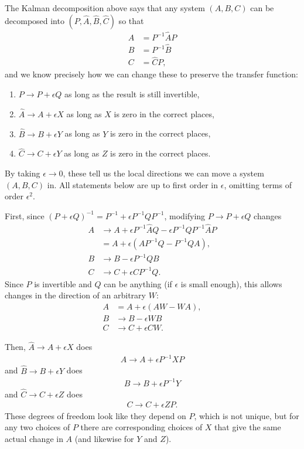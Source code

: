 \documentclass{article}
\newcommand{\1}{\mathbbm{1}}
\begin{document}
The Kalman decomposition above says that any system $(A,B,C)$ can be decomposed into
$(P, \hat A, \hat B, \hat C)$ so that
$$\begin{aligned}
    A &= P^{-1} \hat A P  \\
    B &= P^{-1} \hat B  \\
    C &= \hat C P ,
\end{aligned}$$
and we know precisely how we can change these to preserve the transfer function:
\begin{enumerate}
    \item $P \to P + \epsilon Q$ as long as the result is still invertible,
    \item $\hat A \to A + \epsilon X$ as long as $X$ is zero in the correct places,
    \item $\hat B \to B + \epsilon Y$ as long as $Y$ is zero in the correct places,
    \item $\hat C \to C + \epsilon Y$ as long as $Z$ is zero in the correct places.
\end{enumerate}
By taking $\epsilon \to 0$, these tell us the local directions we can move a system $(A,B,C)$ in.
All statements below are up to first order in $\epsilon$,
omitting terms of order $\epsilon^2$.

First, since $(P + \epsilon Q)^{-1} = P^{-1} + \epsilon P^{-1} Q P^{-1}$,
modifying $P \to P + \epsilon Q$ changes
$$\begin{aligned}
    A 
        &\to A + \epsilon P^{-1} \hat A Q - \epsilon P^{-1} Q P^{-1} \hat A P \\
        &= A + \epsilon \left(A P^{-1} Q - P^{-1} Q A\right) , \\
    B
        &\to B - \epsilon P^{-1} Q B \\
    C
        &\to C + \epsilon C P^{-1} Q .
\end{aligned}$$
Since $P$ is invertible and $Q$ can be anything (if $\epsilon$ is small enough),
this allows changes in the direction of an arbitrary $W$:
$$\begin{aligned}
    A 
        &= A + \epsilon \left(A W - W A\right) , \\
    B
        &\to B - \epsilon W B \\
    C
        &\to C + \epsilon C W .
\end{aligned}$$

Then, $\hat A \to A + \epsilon X$  does
$$\begin{aligned}
    A \to A + \epsilon P^{-1} X P 
\end{aligned}$$
and $\hat B \to B + \epsilon Y$ does
$$\begin{aligned}
    B \to B + \epsilon P^{-1} Y
\end{aligned}$$
and $\hat C \to C + \epsilon Z$ does
$$\begin{aligned}
    C \to C + \epsilon Z P .
\end{aligned}$$
These degrees of freedom look like they depend on $P$, 
which is not unique,
but for any two choices of $P$ there are corresponding choices of $X$
that give the same actual change in $A$ (and likewise for $Y$ and $Z$).
\end{document}
